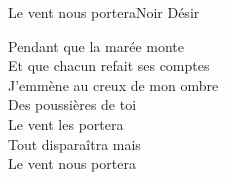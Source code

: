 \begin{song}{Le vent nous portera}{Noir Désir}
\begin{guitar}
Pendant que la marée monte\\
Et que chacun refait ses comptes\\
J'emmène au creux de mon ombre\\
Des poussières de toi\\
Le vent les portera\\
Tout disparaîtra mais\\
Le vent nous portera \\
\end{guitar}
\end{song}
